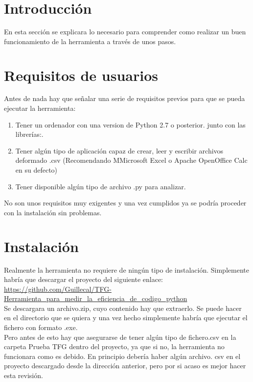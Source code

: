 
\section{Introducción}
En esta sección se explicara lo necesario para comprender como realizar un buen funcionamiento de la herramienta  a través de  unos pasos.
\section{Requisitos de usuarios}
Antes de nada hay que señalar una serie de requisitos previos para que se pueda ejecutar la herramienta:

\begin{enumerate}
	\item Tener un ordenador con una version de Python 2.7 o posterior. junto con las librerías:.
	\item Tener algún tipo de aplicación capaz de crear, leer y escribir archivos deformado .csv (Recomendando MMicrosoft Excel o Apache OpenOffice Calc en su defecto)
	\item Tener disponible algún tipo de  archivo .py para analizar.
\end{enumerate}


No son unos requisitos muy exigentes y una vez cumplidos ya se podría proceder con la instalación sin problemas.

\section{Instalación}
Realmente la herramienta no requiere de ningún tipo de instalación. Simplemente habría que descargar el proyecto del siguiente enlace:\\

\url{https://github.com/Guillecal/TFG-Herramienta_para_medir_la_eficiencia_de_codigo_python}\\

Se descargara un archivo.zip, cuyo contenido hay que extraerlo. Se puede hacer en el directorio que se quiera y una vez hecho simplemente habría que ejecutar el fichero con formato .exe.\\

Pero antes de esto hay que asegurarse de tener algún tipo de fichero.csv en la carpeta Prueba TFG dentro del proyecto, ya que si no, la  herramienta no funcionara como es debido. En principio debería haber algún archivo. csv en el proyecto descargado desde la dirección anterior, pero por si acaso es mejor hacer esta revisión.


